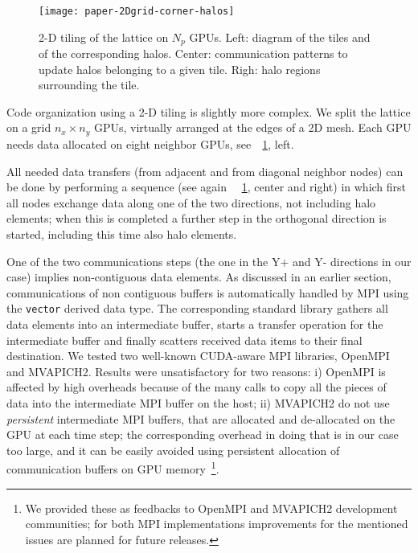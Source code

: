 \documentclass{elsarticle}
\begin{document}
%
\begin{figure}
\centering
\texttt{[image: paper-2Dgrid-corner-halos]}
\caption{\label{2D-tiling} 
2-D tiling of the lattice on $N_p$ GPUs. Left: diagram 
of the tiles and of the corresponding halos. Center: communication patterns 
to update halos belonging to a given tile. Righ: halo regions surrounding the tile.}
\end{figure}
%

Code organization using a 2-D tiling is slightly more complex.
%
We split the lattice on a grid $n_x \times n_y$  GPUs, virtually arranged 
at the edges of a 2D mesh.
%
Each GPU needs data  allocated on eight neighbor GPUs, 
see~\figurename~\ref{2D-tiling}, left.

All needed data transfers (from adjacent and from diagonal neighbor nodes) 
can be done by performing a sequence (see again ~\figurename~\ref{2D-tiling}, center and right) 
in which first all nodes exchange data along one of the two directions, not including
halo elements; when this is completed a further step in the orthogonal direction is started, 
including this time also halo elements.

One of the two communications steps (the one in the Y+ and Y- directions in our case) 
implies non-contiguous data elements. As discussed in an earlier section,
communications of non contiguous buffers is automatically handled by MPI 
using the {\tt vector} derived data type. The corresponding standard library 
gathers all data elements into an intermediate buffer, starts a transfer 
operation for the intermediate buffer and finally scatters received data 
items to their final destination. 
%
We tested two well-known CUDA-aware MPI libraries, OpenMPI and MVAPICH2. 
%
Results were unsatisfactory for two reasons: 
%
i) OpenMPI is affected by high overheads because of the many calls to copy 
all the pieces of data into the intermediate MPI buffer on the host;
%   
ii) MVAPICH2 do not use {\em persistent} intermediate MPI buffers, 
that are allocated and de-allocated on the GPU at each time step; 
the corresponding overhead in doing that is in our case too large, 
and it can be easily avoided using persistent allocation of communication 
buffers on GPU memory~\footnote{
We provided these as feedbacks to OpenMPI and MVAPICH2 development communities;  
for both MPI implementations improvements for the mentioned issues are 
planned for future releases.}. 
\end{document}
